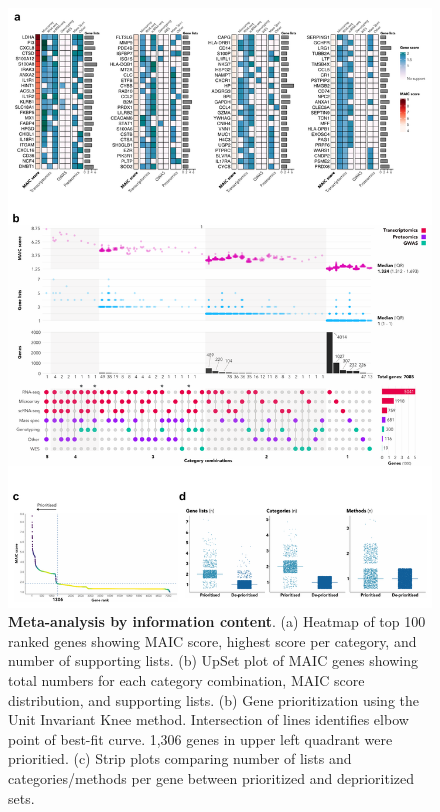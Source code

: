 \documentclass[
  11,
  a4paper,
]{article}
\begin{document}
\begin{figure}

{\centering \includegraphics{./img/Figure_1.png}

}

\caption{\label{fig-fig1}\textbf{Meta-analysis by information content}.
(a) Heatmap of top 100 ranked genes showing MAIC score, highest score
per category, and number of supporting lists. (b) UpSet plot of MAIC
genes showing total numbers for each category combination, MAIC score
distribution, and supporting lists. (b) Gene prioritization using the
Unit Invariant Knee method. Intersection of lines identifies elbow point
of best-fit curve. 1,306 genes in upper left quadrant were prioritied.
(c) Strip plots comparing number of lists and categories/methods per
gene between prioritized and deprioritized sets.}

\end{figure}
\end{document}
